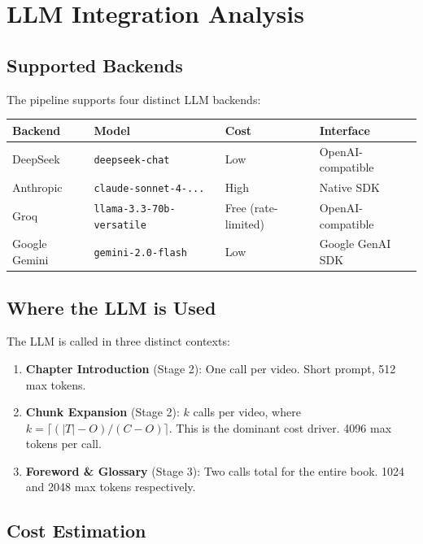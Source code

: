 \documentclass[11pt,a4paper]{article}
\begin{document}
\section{LLM Integration Analysis}

\subsection{Supported Backends}

The pipeline supports four distinct LLM backends:

\begin{center}
\begin{tabular}{llll}
\toprule
\textbf{Backend} & \textbf{Model} & \textbf{Cost} & \textbf{Interface}\\
\midrule
DeepSeek & \texttt{deepseek-chat} & Low & OpenAI-compatible\\
Anthropic & \texttt{claude-sonnet-4-...} & High & Native SDK\\
Groq & \texttt{llama-3.3-70b-versatile} & Free (rate-limited) & OpenAI-compatible\\
Google Gemini & \texttt{gemini-2.0-flash} & Low & Google GenAI SDK\\
\bottomrule
\end{tabular}
\end{center}

\subsection{Where the LLM is Used}

The LLM is called in three distinct contexts:

\begin{enumerate}
    \item \textbf{Chapter Introduction} (Stage 2): One call per video. Short prompt, 512 max tokens.
    \item \textbf{Chunk Expansion} (Stage 2): $k$ calls per video, where $k = \lceil (|T| - O) / (C - O) \rceil$. This is the dominant cost driver. 4096 max tokens per call.
    \item \textbf{Foreword \& Glossary} (Stage 3): Two calls total for the entire book. 1024 and 2048 max tokens respectively.
\end{enumerate}

\subsection{Cost Estimation}
\end{document}
